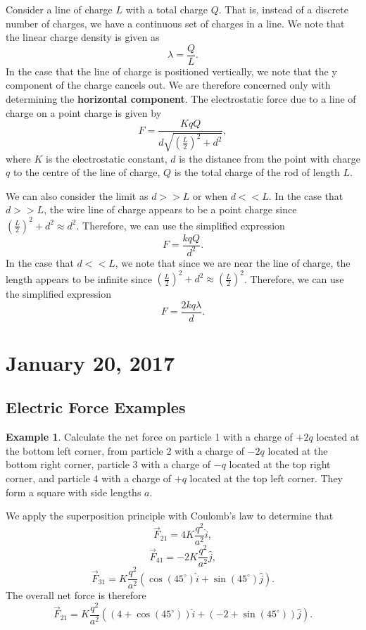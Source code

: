 \documentclass[11pt]{article}
\theoremstyle{plain} %
\theoremstyle{definition}
\theoremstyle{example}
\newtheorem*{example}{Example}
\theoremstyle{remark}
\begin{document}
Consider a line of charge $L$ with a total charge $Q$. That is, instead of a discrete number of charges, we have a continuous set of charges in a line. We note that the linear charge density is given as
$$\lambda = \frac{Q}{L}.$$
In the case that the line of charge is positioned vertically, we note that the y component of the charge cancels out. We are therefore concerned only with determining the \textbf{horizontal component}. The electrostatic force due to a line of charge on a point charge is given by
$$F = \frac{KqQ}{d\sqrt{\left(\frac{L}{2}\right)^2+d^2}},$$
where $K$ is the electrostatic constant, $d$ is the distance from the point with charge $q$ to the centre of the line of charge, $Q$ is the total charge of the rod of length $L$. 

We can also consider the limit as $d>>L$ or when $d<<L$. In the case that $d>>L$, the wire line of charge appears to be a point charge since $\left(\frac{L}{2}\right)^2+d^2 \approx d^2$. Therefore, we can use the simplified expression 
$$F = \frac{kqQ}{d^2}.$$
In the case that $d<<L$, we note that since we are near the line of charge, the length appears to be infinite since $\left(\frac{L}{2}\right)^2+d^2 \approx \left(\frac{L}{2}\right)^2$. Therefore, we can use the simplified expression 
$$F = \frac{2kq\lambda}{d}.$$



\section{January 20, 2017}
\subsection{Electric Force Examples}

\begin{example}
Calculate the net force on particle 1 with a charge of $+2q$ located at the bottom left corner, from particle 2 with a charge of $-2q$ located at the bottom right corner, particle 3 with a charge of $-q$ located at the top right corner, and particle 4 with a charge of $+q$ located at the top left corner. They form a square with side lengths $a$. 
\end{example}

We apply the superposition principle with Coulomb's law to determine that $$\vec{F}_{21} = 4K\frac{q^2}{a^2}\hat{i},$$ 
$$\vec{F}_{41} = -2K\frac{q^2}{a^2}\hat{j},$$
$$\vec{F}_{31} = K\frac{q^2}{a^2}\left(\cos\left(45^{\circ}\right)\hat{i}+\sin\left(45^{\circ}\right)\hat{j}\right).
$$
The overall net force is therefore
$$\vec{F}_{21} = K\frac{q^2}{a^2}\left(\left(4+\cos\left(45^{\circ}\right)\right)\hat{i}+\left(-2+\sin\left(45^{\circ}\right)\right)\hat{j}\right).
$$
\end{document}
